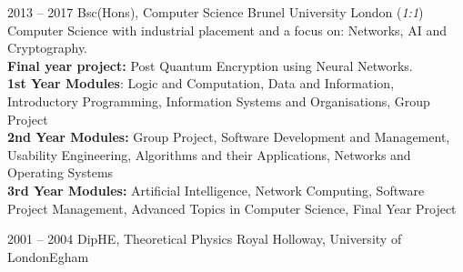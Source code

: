 \cventry
{2013 -- 2017}
{Bsc(Hons), Computer Science}
{Brunel University}
{London}
{(\textit{1:1})}
{Computer Science with industrial placement and a focus on: Networks, AI and
 Cryptography. \\ 
    \textbf{Final year project: }Post Quantum Encryption using Neural Networks. \\
    \textbf{1st Year Modules}: Logic and Computation, Data and Information,
                Introductory Programming, Information Systems and Organisations,
                Group Project\\
    \textbf{2nd Year Modules: }Group Project, Software Development and Management,
                Usability Engineering, Algorithms and their Applications, Networks
                and Operating Systems \\
    \textbf{3rd Year Modules: }Artificial Intelligence, Network Computing,
                Software Project Management, Advanced Topics in Computer Science,
                Final Year Project\\}

\cventry
{2001 -- 2004}
{DipHE, Theoretical Physics}
{Royal Holloway, University of London}{Egham}
{}{}

